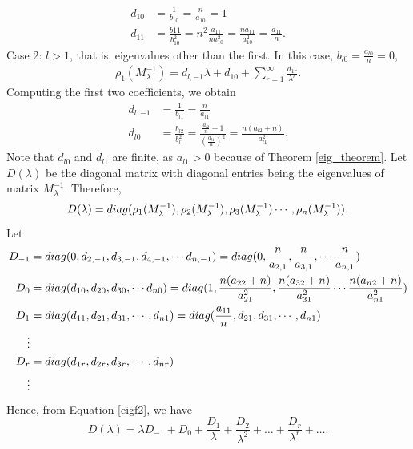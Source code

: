 \documentclass[multixcb]{amstext-l}
\theoremstyle{plain}
\theoremstyle{definition}
\theoremstyle{definition}
\theoremstyle{remark}
\numberwithin{equation}{chapter}
\newcommand{\diag}{\mathop{\rm diag}}
\begin{document}
\begin{equation}\label{first_eig}
\begin{aligned}
d_{10} &= \frac{1}{b_{10}} = \frac{n}{a_{10}} = 1\\
d_{11} &= \frac{b{11}}{b_{10}^2} = n^2\frac{a_{11}}{na_{10}^2} = \frac{na_{11}}{a_{10}^2} = \frac{a_{11}}{n}.
\end{aligned}
\end{equation}
Case 2: $l>1$, that is, eigenvalues other than the first. In this case, $b_{l0} = \frac{a_{l0}}{n} = 0$, 
\begin{equation}\label{eigf2}
\begin{aligned}
\rho_1(M_{\lambda}^{-1}) = d_{l,-1}\lambda + d_{10} + \sum\limits_{r=1}^{\infty}\frac{d_{1r}}{\lambda^r}.
\end{aligned}
\end{equation}
Computing the first two coefficients, we obtain \begin{equation}\label{eig_second}
\begin{aligned}
d_{l,-1} &= \frac{1}{b_{l1}} = \frac{n}{a_{l1}}\\
d_{l0}   &= \frac{b_{l2}}{b_{l1}^2} = \frac{\frac{a_{l2}}{n}+1}{(\frac{a_{l1}}{n})^2} = \frac{n(a_{l2}+n)}{a_{l1}^2}. 
\end{aligned}
\end{equation}
Note that $d_{l0}$ and $d_{l1}$ are finite, as $a_{l1}>0$ because of Theorem \ref{eig_theorem}. Let $D(\lambda)$ be the diagonal matrix with diagonal entries being the eigenvalues of matrix $M_{\lambda}^{-1}$. Therefore, \begin{equation}\label{diag_eig}
D(\lambda) = \diag(\rho_1(M_{\lambda}^{-1}),\rho_2(M_{\lambda}^{-1}),\rho_3(M_{\lambda}^{-1})\cdots,\rho_n(M_{\lambda}^{-1})).
\end{equation}
Let \begin{equation}\label{d_entries}
\begin{aligned}
D_{-1} &= \diag(0,d_{2,-1},d_{3,-1},d_{4,-1},\cdots d_{n,-1}) = \diag(0,\frac{n}{a_{2,1}},\frac{n}{a_{3,1}},\cdots \frac{n}{a_{n,1}})\\
D_{0} &= \diag(d_{10},d_{20},d_{30},\cdots d_{n0}) = \diag(1,\frac{n(a_{22}+n)}{a_{21}^2},\frac{n(a_{32}+n)}{a_{31}^2}\cdots \frac{n(a_{n2}+n)}{a_{n1}^2})\\
D_{1} &= \diag(d_{11},d_{21},d_{31},\cdots,d_{n1}) = \diag(\frac{a_{11}}{n},d_{21},d_{31},\cdots,d_{n1})\\
\vdots\\
D_{r} & = \diag(d_{1r},d_{2r},d_{3r},\cdots,d_{nr})\\
\vdots
\end{aligned}
\end{equation}
Hence, from Equation \ref{eigf2}, we have \begin{equation}\label{deq_ex}
D(\lambda) = \lambda D_{-1} + D_{0} + \frac{D_{1}}{\lambda} + \frac{D_2}{\lambda^2}+\ldots + \frac{D_r}{\lambda^r}+\ldots. 
\end{equation}
 
\end{document}
